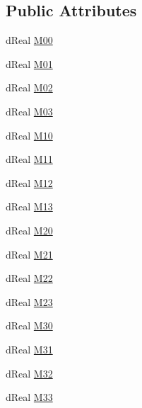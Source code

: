 \subsection*{Public Attributes}
\begin{DoxyCompactItemize}
\item 
dReal \hyperlink{struct_tao_1_1_ode_1_1_ode_1_1d_matrix4_a761f298e5e7b3e2e98c4162c27c01fcd}{M00}
\item 
dReal \hyperlink{struct_tao_1_1_ode_1_1_ode_1_1d_matrix4_a8bbeac5e6688f48fb799c3a3e5310bc7}{M01}
\item 
dReal \hyperlink{struct_tao_1_1_ode_1_1_ode_1_1d_matrix4_a60d26310b5bb860657510e9e539d0f8b}{M02}
\item 
dReal \hyperlink{struct_tao_1_1_ode_1_1_ode_1_1d_matrix4_ad3a7bc1ecdc3b4ab2c1ac57cac274867}{M03}
\item 
dReal \hyperlink{struct_tao_1_1_ode_1_1_ode_1_1d_matrix4_ac00fa30c48417581eecc3e7c277b316c}{M10}
\item 
dReal \hyperlink{struct_tao_1_1_ode_1_1_ode_1_1d_matrix4_aa5c0b6504e251465fec28c34b266a010}{M11}
\item 
dReal \hyperlink{struct_tao_1_1_ode_1_1_ode_1_1d_matrix4_a4af68abb775b819ba5cfd8202a6e46af}{M12}
\item 
dReal \hyperlink{struct_tao_1_1_ode_1_1_ode_1_1d_matrix4_ac38f18e6ae768ce1232a6627730bf519}{M13}
\item 
dReal \hyperlink{struct_tao_1_1_ode_1_1_ode_1_1d_matrix4_a5d56d9f9f9472d8a88f84d1fbb4b8fe4}{M20}
\item 
dReal \hyperlink{struct_tao_1_1_ode_1_1_ode_1_1d_matrix4_a1e695c8ba986b6f70e4aa5375c253f5d}{M21}
\item 
dReal \hyperlink{struct_tao_1_1_ode_1_1_ode_1_1d_matrix4_a7f8c8e43ce0a6e3378492a8a1ce952ce}{M22}
\item 
dReal \hyperlink{struct_tao_1_1_ode_1_1_ode_1_1d_matrix4_a96ef90f0dd67231571b9554e01a1065f}{M23}
\item 
dReal \hyperlink{struct_tao_1_1_ode_1_1_ode_1_1d_matrix4_a7a853d3deaf8029205e7b29b1eefc029}{M30}
\item 
dReal \hyperlink{struct_tao_1_1_ode_1_1_ode_1_1d_matrix4_aaa9db7a47c9a09c6a7693f1c1a218508}{M31}
\item 
dReal \hyperlink{struct_tao_1_1_ode_1_1_ode_1_1d_matrix4_af47bfabc144919997eb911ddec7b3174}{M32}
\item 
dReal \hyperlink{struct_tao_1_1_ode_1_1_ode_1_1d_matrix4_a37b5fe27fcebd8be5549799f46dd8ec7}{M33}
\end{DoxyCompactItemize}
